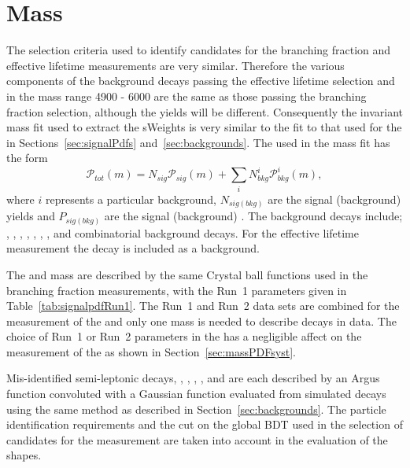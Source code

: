 \section{Mass \pdfs}
\label{sec:ELmasspdfs}
The selection criteria used to identify \bsmumu candidates for the \bmumu branching fraction and \bsmumu effective lifetime measurements are very similar. 
Therefore the various components of the background decays passing the \bsmumu effective lifetime selection and in the mass range 4900 - 6000 \mevcc are the same as those passing the branching fraction selection, although the yields will be different. %
Consequently the invariant mass fit used to extract the sWeights is very similar to the fit to that used for the \BFm in Sections~\ref{sec:signalPdfs} and~\ref{sec:backgrounds}. The \pdf used in the mass fit has the form
\begin{equation}
\mathcal{P}_{tot}(m) = N_{sig}\mathcal{P}_{sig}(m) + \displaystyle\sum_{i} N^i_{bkg}\mathcal{P}^i_{bkg}(m),
\label{eq:masspdf}
\end{equation}
where $i$ represents a particular background, $N_{sig(bkg)}$ are the signal (background) yields and $P_{sig(bkg)}$ are the signal (background) \pdfs. The background decays include; \bdmumu, \bhh, \lambdab, \bdpimunu, \bsKmunu, \bupimumu, \bdpimumu, \bcjpsimunu and combinatorial background decays. For the effective lifetime measurement the \bdmumu decay is included as a background. 



The \bsmumu and \bdmumu mass \pdfs are described by the same Crystal ball functions used in the branching fraction measurements, with the Run~1 parameters given in Table~\ref{tab:signalpdfRun1}. The Run~1 and Run~2 data sets are combined for the measurement of the \bsmumu \el and only one mass \pdf is needed to describe \bmumu decays in data. The choice of Run~1 or Run~2 parameters in the \pdf has a negligible affect on the measurement of the \bsmumu \el as shown in Section~\ref{sec:massPDFsyst}.

Mis-identified semi-leptonic decays, \lambdab, \bdpimunu, \bsKmunu, \bupimumu, \bdpimumu and \bcjpsimunu are each described by an Argus function convoluted with a Gaussian function evaluated from simulated decays using the same method as described in Section~\ref{sec:backgrounds}. The particle identification requirements and the cut on the global BDT used in the selection of candidates for the \el measurement are taken into account in the evaluation of the \pdf shapes. %

